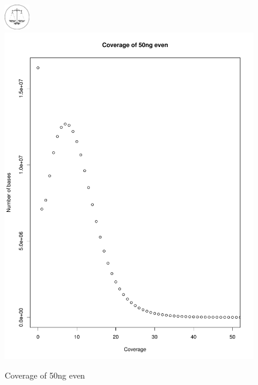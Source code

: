 \documentclass[a4paper,12pt]{report}
\begin{document}
\begin{figure}[ht!]
  \centering
    \includegraphics[width=0.1\textwidth]{figures/logos/even.png}
  \centering
    \includegraphics[width=\textwidth,trim=0 0 0 50, clip]{figures/coverageperbase-50ng_even.pdf}
  \caption{Coverage of 50ng even}
  \label{fig:coverage50ngeven}
\end{figure}
\end{document}

